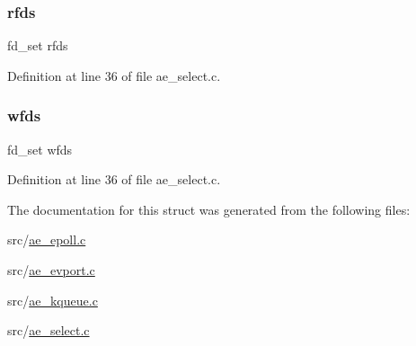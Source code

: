 \subsubsection{\texorpdfstring{rfds}{rfds}}
{\footnotesize\ttfamily fd\+\_\+set rfds}



Definition at line 36 of file ae\+\_\+select.\+c.

\mbox{\label{structae_api_state_a6391a90ddf873c2555b842a474fb9309}} 
\subsubsection{\texorpdfstring{wfds}{wfds}}
{\footnotesize\ttfamily fd\+\_\+set wfds}



Definition at line 36 of file ae\+\_\+select.\+c.



The documentation for this struct was generated from the following files\+:\begin{DoxyCompactItemize}
\item 
src/\hyperlink{ae__epoll_8c}{ae\+\_\+epoll.\+c}\item 
src/\hyperlink{ae__evport_8c}{ae\+\_\+evport.\+c}\item 
src/\hyperlink{ae__kqueue_8c}{ae\+\_\+kqueue.\+c}\item 
src/\hyperlink{ae__select_8c}{ae\+\_\+select.\+c}\end{DoxyCompactItemize}
